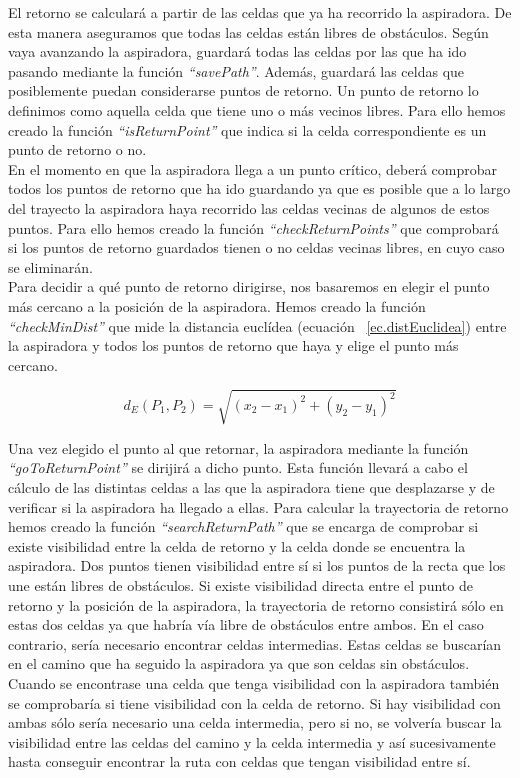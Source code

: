 El retorno se calculará a partir de las celdas que ya ha recorrido la aspiradora. De esta manera aseguramos que todas las celdas están libres de obstáculos. Según vaya avanzando la aspiradora, guardará todas las celdas por las que ha ido pasando mediante la función \textit{``savePath''}. Además, guardará las celdas que posiblemente puedan considerarse puntos de retorno. Un punto de retorno lo definimos como aquella celda que tiene uno o más vecinos libres. Para ello hemos creado la función \textit{``isReturnPoint''} que indica si la celda correspondiente es un punto de retorno o no.\\

En el momento en que la aspiradora llega a un punto crítico, deberá comprobar todos los puntos de retorno que ha ido guardando ya que es posible que a lo largo del trayecto la aspiradora haya recorrido las celdas vecinas de algunos de estos puntos. Para ello hemos creado la función \textit{``checkReturnPoints''} que comprobará si los puntos de retorno guardados tienen o no celdas vecinas libres, en cuyo caso se eliminarán. \\

Para decidir a qué punto de retorno dirigirse, nos basaremos en elegir el punto más cercano a la posición de la aspiradora. Hemos creado la función \textit{``checkMinDist''} que mide la distancia euclídea (ecuación ~\ref{ec.distEuclidea}) entre la aspiradora y todos los puntos de retorno que haya y elige el punto más cercano.

\begin{equation}
\label{ec.distEuclidea}
d_{E}(P_{1}, P_{2}) = \sqrt{(x_{2} - x_{1})^{2} + (y_{2} - y_{1})^{2}}
\end{equation}

Una vez elegido el punto al que retornar, la aspiradora mediante la función \textit{``goToReturnPoint''} se dirijirá a dicho punto. Esta función llevará a cabo el cálculo de las distintas celdas a las que la aspiradora tiene que desplazarse y de verificar si la aspiradora ha llegado a ellas. Para calcular la trayectoria de retorno hemos creado la función \textit{``searchReturnPath''} que se encarga de comprobar si existe visibilidad entre la celda de retorno y la celda donde se encuentra la aspiradora. Dos puntos tienen visibilidad entre sí si los puntos de la recta que los une están libres de obstáculos. Si existe visibilidad directa entre el punto de retorno y la posición de la aspiradora, la trayectoria de retorno consistirá sólo en estas dos celdas ya que habría vía libre de obstáculos entre ambos. En el caso contrario, sería necesario encontrar celdas intermedias. Estas celdas se buscarían en el camino que ha seguido la aspiradora ya que son celdas sin obstáculos. Cuando se encontrase una celda que tenga visibilidad con la aspiradora también se comprobaría si tiene visibilidad con la celda de retorno. Si hay visibilidad con ambas sólo sería necesario una celda intermedia, pero si no, se volvería buscar la visibilidad entre las celdas del camino y la celda intermedia y así sucesivamente hasta conseguir encontrar la ruta con celdas que tengan visibilidad entre sí.\\

